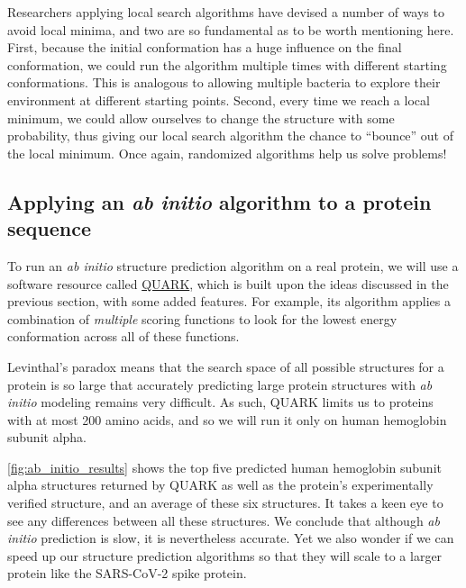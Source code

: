 \begin{qbox}\end{qbox}

Researchers applying local search algorithms have devised a number of ways to avoid local minima, and two are so fundamental as to be worth mentioning here. First, because the initial conformation has a huge influence on the final conformation, we could run the algorithm multiple times with different starting conformations. This is analogous to allowing multiple bacteria to explore their environment at different starting points. Second, every time we reach a local minimum, we could allow ourselves to change the structure with some probability, thus giving our local search algorithm the chance to ``bounce'' out of the local minimum. Once again, randomized algorithms help us solve problems!

\FloatBarrier
{}
\subsection{Applying an \textit{ab initio} algorithm to a protein sequence}

To run an \textit{ab initio} structure prediction algorithm on a real protein, we will use a software resource called \href{https://zhanglab.ccmb.med.umich.edu/QUARK/}{QUARK}, which is built upon the ideas discussed in the previous section, with some added features. For example, its algorithm applies a combination of \textit{multiple} scoring functions to look for the lowest energy conformation across all of these functions.

Levinthal's paradox means that the search space of all possible structures for a protein is so large that accurately predicting large protein structures with \textit{ab initio} modeling remains very difficult. As such, QUARK limits us to proteins with at most 200 amino acids, and so we will run it only on human hemoglobin subunit alpha.

\autoref{fig:ab_initio_results} shows the top five predicted human hemoglobin subunit alpha structures returned by QUARK as well as the protein's experimentally verified structure, and an average of these six structures. It takes a keen eye to see any differences between all these structures. We conclude that although \textit{ab initio} prediction is slow, it is nevertheless accurate. Yet we also wonder if we can speed up our structure prediction algorithms so that they will scale to a larger protein like the SARS-CoV-2 spike protein.\\


